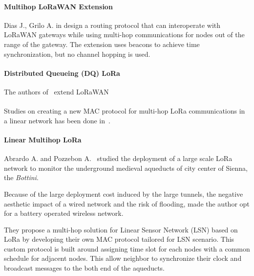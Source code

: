 \paragraph{Multihop LoRaWAN Extension} Dias J., Grilo A. in \cite{DIAS2018424}
design a routing protocol that can interoperate with LoRaWAN gateways while
using multi-hop communications for nodes out of the range of the gateway.  
The extension uses beacons to achieve time synchronization, but no channel
hopping is used.

\paragraph{Distributed Queueing (DQ) LoRa}

The authors of~\cite{8856256} extend LoRaWAN


\paragraph{}

Studies on creating a new MAC protocol for multi-hop LoRa communications in a linear
network has been done in~\cite{Abrardo_2019,duong2018}.

\paragraph{Linear Multihop LoRa}

Abrardo A. and Pozzebon A.~\cite{Abrardo_2019} studied the deployment of a
large scale LoRa network to monitor the underground medieval aqueducts of city center 
of Sienna, the \emph{Bottini}.

Because of the large deployment cost induced by the large tunnels, the negative 
aesthetic impact of a wired network and the risk of flooding, made the author
opt for a battery operated wireless network.

They propose a multi-hop solution for Linear Sensor Network (LSN) based on LoRa by
developing their own MAC protocol tailored for LSN scenario.
This custom protocol is built around assigning time slot for each nodes with
a common schedule for adjacent nodes.
This allow neighbor to synchronize their clock and broadcast messages to the
both end of the aqueducts.

